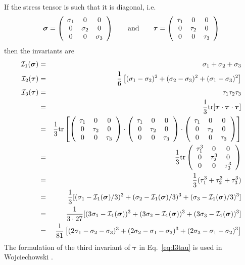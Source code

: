 If the stress tensor is such that it is diagonal, i.e.
\[
{\bm \sigma}= \left( \begin{array}{ccc}
\sigma_1 & 0 & 0 \\
0 & \sigma_2 & 0 \\
0 & 0 & \sigma_3
\end{array}\right)
\qquad
{\rm and}
\qquad
{\bm \tau}= \left( \begin{array}{ccc}
\tau_1 & 0 & 0 \\
0 & \tau_2 & 0 \\
0 & 0 & \tau_3
\end{array}\right)
\]
then the invariants are 
\begin{eqnarray}
{\cal I}_1({\bm \sigma}) &=& \sigma_1 + \sigma_2+ \sigma_3 \nonumber\\
{\cal I}_2({\bm \tau}) &=& \frac{1}{6}\left[(\sigma_{1}-\sigma_{2})^2 + (\sigma_{2}-\sigma_{3})^2 
+ (\sigma_{1}-\sigma_{3})^2 \right] \\ 
{\cal I}_3({\bm \tau}) 
&=& \tau_1\tau_2\tau_3 \nonumber\\
&=& \frac{1}{3} {\rm tr}[{\bm \tau}\cdot{\bm \tau}\cdot {\bm \tau}]  \nonumber\\
&=& \frac{1}{3} {\rm tr}
\left[
\left(
\begin{array}{ccc}
\tau_1 & 0 & 0 \\
0 & \tau_2 & 0 \\
0 & 0 & \tau_3 
\end{array}
\right)
\cdot
\left(
\begin{array}{ccc}
\tau_1 & 0 & 0 \\
0 & \tau_2 & 0 \\
0 & 0 & \tau_3 
\end{array}
\right)
\cdot
\left(
\begin{array}{ccc}
\tau_1 & 0 & 0 \\
0 & \tau_2 & 0 \\
0 & 0 & \tau_3 
\end{array}
\right)
\right] \nonumber\\
&=&  \frac{1}{3} {\rm tr}
\left(
\begin{array}{ccc}
\tau_1^3 & 0 & 0 \\
0 & \tau_2^3 & 0 \\
0 & 0 & \tau_3^3 
\end{array}
\right) \nonumber\\
&=& \frac{1}{3}(\tau_1^3+\tau_2^3+\tau_3^3) \nonumber\\
&=&  \frac{1}{3} [ 
(\sigma_1-{\cal I}_1({\bm \sigma})/3)^3+  
(\sigma_2-{\cal I}_1({\bm \sigma})/3)^3+
(\sigma_3-{\cal I}_1({\bm \sigma})/3)^3 ]   \nonumber\\ 
&=&  \frac{1}{3\cdot 27} [ 
(3\sigma_1-{\cal I}_1({\bm \sigma}))^3+  
(3\sigma_2-{\cal I}_1({\bm \sigma}))^3+
(3\sigma_3-{\cal I}_1({\bm \sigma}))^3 ]   \nonumber\\ 
&=& \frac{1}{81}
\left[
(2\sigma_1-\sigma_2-\sigma_3)^3+
(2\sigma_2-\sigma_1-\sigma_3)^3+
(2\sigma_3-\sigma_1-\sigma_2)^3
\right] 
\label{eq:3rdinvb} \label{eq:I3tau}
\end{eqnarray}
The formulation of the third invariant of ${\bm \tau}$  in Eq.~\ref{eq:I3tau} 
is used in Wojciechowski \cite{wojc18}.











